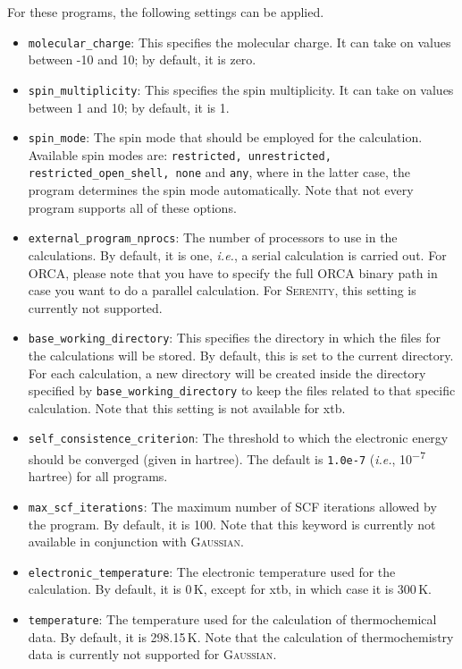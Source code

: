 \documentclass[]{tufte-book}
\begin{document}
For these programs, the following settings can be applied.
\begin{itemize}
\item \texttt{molecular\_charge}: This specifies the molecular charge. It can take on values between -10 and 10; by default,
it is zero.
\item \texttt{spin\_multiplicity}: This specifies the spin multiplicity. It can take on values between 1 and 10; by default,
it is 1.
\item \texttt{spin\_mode}: The spin mode that should be employed for the calculation. Available spin modes are: \texttt{restricted, unrestricted, restricted\_open\_shell, none} and \texttt{any}, where in the latter case, the program determines the spin mode automatically. Note that not every program supports all of these options.
\item \texttt{external\_program\_nprocs}: The number of processors to use in the calculations. By default, it is one, \textit{i.e.},
a serial calculation is carried out. For \textsc{ORCA}, please note that you have to specify the full \textsc{ORCA} binary path in case you want to do a parallel calculation. For \textsc{Serenity}, this setting is currently not supported.
\item \texttt{base\_working\_directory}: This specifies the directory in which the files for the calculations will
be stored. By default, this is set to the current directory. For each calculation, a new directory will be
created inside the directory specified by \texttt{base\_working\_directory} to keep the files related to that specific
calculation. Note that this setting is not available for xtb.
\item \texttt{self\_consistence\_criterion}: The threshold to which the electronic energy should be converged (given in
hartree). The default is \texttt{1.0e-7} (\textit{i.e.}, 10\textsuperscript{$-$7}\,hartree) for all programs.
\item \texttt{max\_scf\_iterations}: The maximum number of SCF iterations allowed by the program. By default, it is 100. Note that this keyword is currently not available in conjunction with \textsc{Gaussian}.
\item \texttt{electronic\_temperature}: The electronic temperature used for the calculation. By default, it is 0\,K, except for xtb, in which case it is 300\,K.
\item \texttt{temperature}: The temperature used for the calculation of thermochemical data. By default, it is 298.15\,K. Note that the calculation of thermochemistry data is currently not supported for \textsc{Gaussian}.
\end{itemize}
\end{document}
